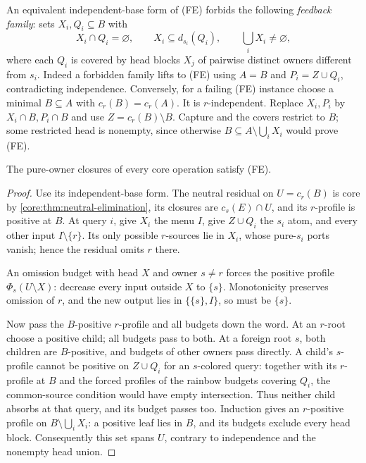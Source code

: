 An equivalent independent-base form of (FE) forbids the following
\emph{feedback family}: sets $X_i,Q_i\subseteq B$ with
\begin{equation}\label{core:eq:base-feedback}
 X_i\cap Q_i=\varnothing,\qquad X_i\subseteq d_{s_i}(Q_i),
 \qquad \bigcup_iX_i\ne\varnothing,
\end{equation}
where each $Q_i$ is covered by head blocks $X_j$ of pairwise distinct
owners different from $s_i$. Indeed a forbidden family lifts to (FE)
using $A=B$ and $P_i=Z\cup Q_i$, contradicting independence.
Conversely, for a failing (FE) instance choose a minimal
$B\subseteq A$ with $c_r(B)=c_r(A)$. It is $r$-independent.
Replace $X_i,P_i$ by $X_i\cap B,P_i\cap B$ and use
$Z=c_r(B)\setminus B$. Capture and the covers restrict to $B$;
some restricted head is nonempty, since otherwise
$B\subseteq A\setminus\bigcup_iX_i$ would prove (FE).

\begin{proposition}
\label{core:prop:feedback-elimination}
The pure-owner closures of every core operation satisfy (FE).
\end{proposition}
\begin{proof}
Use its independent-base form. The neutral residual on $U=c_r(B)$
is core by \cref{core:thm:neutral-elimination}, its closures are
$c_s(E)\cap U$, and its $r$-profile is positive at $B$.
At query $i$, give $X_i$ the menu $I$, give $Z\cup Q_i$ the $s_i$
atom, and every other input $I\setminus\{r\}$. Its only possible
$r$-sources lie in $X_i$, whose pure-$s_i$ ports vanish; hence the
residual omits $r$ there.

An omission budget with head $X$ and owner $s\ne r$ forces the
positive profile $\Phi_s(U\setminus X)$: decrease every input outside
$X$ to $\{s\}$. Monotonicity preserves omission of $r$, and the new
output lies in $\{\{s\},I\}$, so must be $\{s\}$.

Now pass the $B$-positive $r$-profile and all budgets down the word.
At an $r$-root choose a positive child; all budgets pass to both.
At a foreign root $s$, both children are $B$-positive, and budgets
of other owners pass directly. A child's $s$-profile cannot be
positive on $Z\cup Q_i$ for an $s$-colored query: together with
its $r$-profile at $B$ and the forced profiles of the rainbow budgets
covering $Q_i$, the common-source condition would have empty
intersection. Thus neither child absorbs at that query, and its
budget passes too. Induction gives an $r$-positive profile on
$B\setminus\bigcup_iX_i$: a positive leaf lies in $B$, and its budgets
exclude every head block. Consequently this set spans $U$, contrary
to independence and the nonempty head union.
\end{proof}

